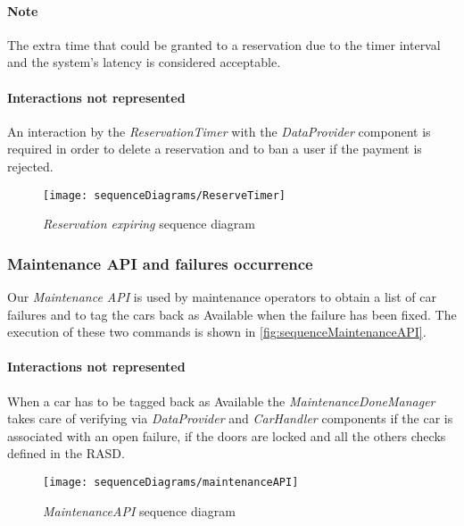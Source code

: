 \paragraph{Note}The extra time that could be granted to a reservation due to the timer interval and the system's latency is considered acceptable.

\paragraph{Interactions not represented} An interaction by the \emph{ReservationTimer} with the \emph{DataProvider} component is required in order to delete a reservation and to ban a user if the payment is rejected.
\begin{figure}[h!]
	\centering
	\texttt{[image: sequenceDiagrams/ReserveTimer]}
	\caption{
		\label{fig:sequenceReserveTimer} 
		\emph{Reservation expiring} sequence diagram
	}
\end{figure}

\clearpage
\subsubsection{Maintenance API and failures occurrence}
Our \emph{Maintenance API} is used by maintenance operators to obtain a list of car failures and to tag the cars back as Available when the failure has been fixed. The execution of these two commands is shown in \autoref{fig:sequenceMaintenanceAPI}.
\paragraph{Interactions not represented}When a car has to be tagged back as \mbox{Available} the \emph{MaintenanceDoneManager} takes care of verifying via \emph{DataProvider} and \emph{CarHandler} components if the car is associated with an open failure, if the doors are locked and all the others checks defined in the RASD.

\begin{figure}[h!]
	\centering
	\texttt{[image: sequenceDiagrams/maintenanceAPI]}
	\caption{
		\label{fig:sequenceMaintenanceAPI} 
		\emph{MaintenanceAPI} sequence diagram
	}
\end{figure}

\clearpage
